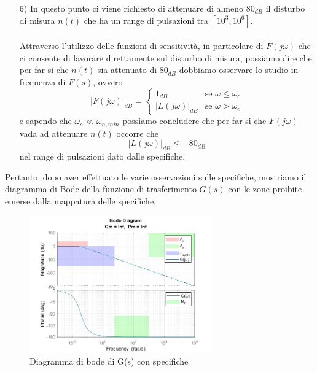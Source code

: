 \documentclass[a4paper, 11pt]{article}
\begin{document}
\begin{itemize}
    \item[6)] In questo punto ci viene richiesto di attenuare di almeno $80_{dB}$ il disturbo di misura $n(t)$ che ha un range di pulsazioni tra $[10^3,10^6]$.
    \\
    \\
    Attraverso l'utilizzo delle funzioni di sensitività, in particolare di $F(j\omega)$ che ci consente di lavorare direttamente sul disturbo di misura, possiamo dire che per far si che $n(t)$ sia attenuato di $80_{dB}$ dobbiamo osservare lo studio in frequenza di $F(s)$, ovvero
    \begin{equation*}
        |F(j\omega)|_{dB} =
        \begin{cases}
            1_{dB} & \text{se $\omega \le \omega_c$} \\
            |L(j\omega)|_{dB} & \text{se $\omega > \omega_c$}
        \end{cases}
    \end{equation*}
    e sapendo che $\omega_c \ll \omega_{n, min}$ possiamo concludere che per far si che $F(j\omega)$ vada ad attenuare $n(t)$ occorre che
    \begin{equation*}
        |L(j\omega)|_{dB} \le -80_{dB}
    \end{equation*}
    nel range di pulsazioni dato dalle specifiche.
\end{itemize}
Pertanto, dopo aver effettuato le varie osservazioni sulle specifiche, mostriamo il diagramma di Bode della funzione di trasferimento $G(s)$ con le zone proibite emerse dalla mappatura delle specifiche.

\begin{figure}[H]
    \centering
    \includegraphics[width=0.70\textwidth]{immagini/specifiche.jpg}
    \caption{Diagramma di bode di G(s) con specifiche}
    \label{fig:specifiche}
\end{figure}
\end{document}
